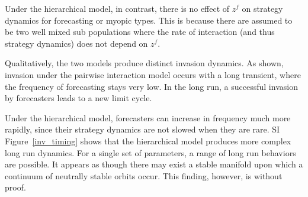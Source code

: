 \documentclass{article}
\begin{document}
Under the hierarchical model, in contrast, there is no effect of $z^f$ on strategy dynamics for forecasting or myopic types. This is because there are assumed to be two well mixed sub populations where the rate of interaction (and thus strategy dynamics) does not depend on $z^f$.  

Qualitatively, the two models produce distinct invasion dynamics. As shown, invasion under the pairwise interaction model occurs with a long transient, where the frequency of forecasting stays very low. In the long run, a successful invasion by forecasters leads to a new limit cycle. 

Under the hierarchical model, forecasters can increase in frequency much more rapidly, since their strategy dynamics are not slowed when they are rare. SI Figure~\ref{inv_timing} shows that the hierarchical model produces more complex long run dynamics. For a single set of parameters, a range of long run behaviors are possible. It appears as though there may exist a stable manifold upon which a continuum of neutrally stable orbits occur. This finding, however, is without proof. 
\end{document}
